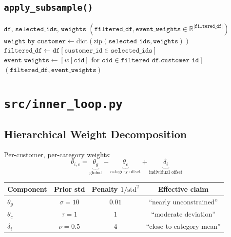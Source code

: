 \documentclass[11pt,a4paper]{article}
\begin{document}
\subsection{\texttt{apply\_subsample()}}

\begin{algorithm}[H]
\caption{\textsc{ApplySubsample}}\label{alg:apply-sub}
\begin{algorithmic}[1]
\Require $\texttt{df}$, $\texttt{selected\_ids}$, $\texttt{weights}$
\Ensure $(\texttt{filtered\_df}, \texttt{event\_weights} \in \mathbb{R}^{|\texttt{filtered\_df}|})$
\State $\texttt{weight\_by\_customer} \gets \text{dict}(\text{zip}(\texttt{selected\_ids}, \texttt{weights}))$
\State $\texttt{filtered\_df} \gets \texttt{df}[\texttt{customer\_id} \in \texttt{selected\_ids}]$
\State $\texttt{event\_weights} \gets [w[\texttt{cid}] \text{ for } \texttt{cid} \in \texttt{filtered\_df.customer\_id}]$
\State \Return $(\texttt{filtered\_df}, \texttt{event\_weights})$
\end{algorithmic}
\end{algorithm}


\section{\texttt{src/inner\_loop.py}}
\label{sec:inner-loop}

\subsection{Hierarchical Weight Decomposition}

Per-customer, per-category weights:
\[
\theta_{i,c} = \underbrace{\theta_g}_{\text{global}} + \underbrace{\theta_c}_{\text{category offset}} + \underbrace{\delta_i}_{\text{individual offset}}
\]

\begin{table}[H]\centering
\begin{tabular}{lccc}
\toprule
Component & Prior std & Penalty $1/\text{std}^2$ & Effective claim \\
\midrule
$\theta_g$ & $\sigma = 10$  & $0.01$ & ``nearly unconstrained'' \\
$\theta_c$ & $\tau = 1$     & $1$    & ``moderate deviation'' \\
$\delta_i$ & $\nu = 0.5$    & $4$    & ``close to category mean'' \\
\bottomrule
\end{tabular}
\end{table}
\end{document}
